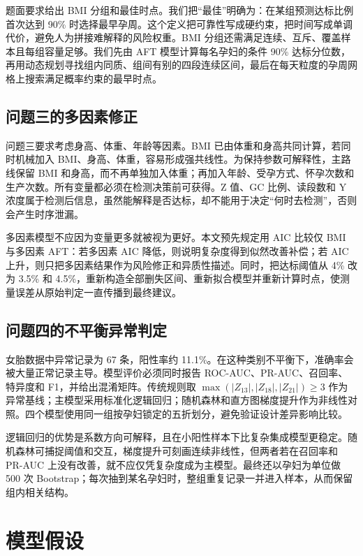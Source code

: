 \documentclass[UTF8,a4paper,12pt]{ctexart}
\begin{document}
题面要求给出 BMI 分组和最佳时点。我们把“最佳”明确为：在某组预测达标比例首次达到 90\% 时选择最早孕周。这个定义把可靠性写成硬约束，把时间写成单调代价，避免人为拼接难解释的风险权重。BMI 分组还需满足连续、互斥、覆盖样本且每组容量足够。我们先由 AFT 模型计算每名孕妇的条件 90\% 达标分位数，再用动态规划寻找组内同质、组间有别的四段连续区间，最后在每天粒度的孕周网格上搜索满足概率约束的最早时点。

\subsection{问题三的多因素修正}

问题三要求考虑身高、体重、年龄等因素。BMI 已由体重和身高共同计算，若同时机械加入 BMI、身高、体重，容易形成强共线性。为保持参数可解释性，主路线保留 BMI 和身高，而不再单独加入体重；再加入年龄、受孕方式、怀孕次数和生产次数。所有变量都必须在检测决策前可获得。Z 值、GC 比例、读段数和 Y 浓度属于检测后信息，虽然能解释是否达标，却不能用于决定“何时去检测”，否则会产生时序泄漏。

多因素模型不应因为变量更多就被视为更好。本文预先规定用 AIC 比较仅 BMI 与多因素 AFT：若多因素 AIC 降低，则说明复杂度得到似然改善补偿；若 AIC 上升，则只把多因素结果作为风险修正和异质性描述。同时，把达标阈值从 4\% 改为 3.5\% 和 4.5\%，重新构造全部删失区间、重新拟合模型并重新计算时点，使测量误差从原始判定一直传播到最终建议。

\subsection{问题四的不平衡异常判定}

女胎数据中异常记录为 67 条，阳性率约 11.1\%。在这种类别不平衡下，准确率会被大量正常记录主导。模型评价必须同时报告 ROC-AUC、PR-AUC、召回率、特异度和 F1，并给出混淆矩阵。传统规则取 $\max(|Z_{13}|,|Z_{18}|,|Z_{21}|)\ge3$ 作为异常基线；主模型采用标准化逻辑回归；随机森林和直方图梯度提升作为非线性对照。四个模型使用同一组按孕妇锁定的五折划分，避免验证设计差异影响比较。

逻辑回归的优势是系数方向可解释，且在小阳性样本下比复杂集成模型更稳定。随机森林可捕捉阈值和交互，梯度提升可刻画连续非线性，但两者若在召回率和 PR-AUC 上没有改善，就不应仅凭复杂度成为主模型。最终还以孕妇为单位做 500 次 Bootstrap；每次抽到某名孕妇时，整组重复记录一并进入样本，从而保留组内相关结构。

\section{模型假设}
\end{document}
